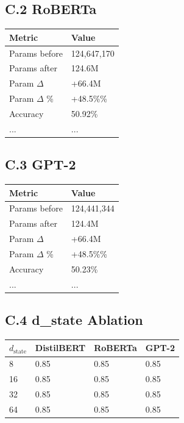 \subsection{C.2 RoBERTa}

\begin{table}[H]
\centering
\small
\begin{tabular}{ll}
\toprule
\textbf{Metric} & \textbf{Value} \\
\midrule
Params before & 124,647,170 \\
Params after & 124.6M \\
Param $\Delta$ & +66.4M \\
Param $\Delta$ \% & +48.5\%\% \\
Accuracy & 50.92\% \\
... & ... \\
\bottomrule
\end{tabular}
\end{table}

\subsection{C.3 GPT-2}

\begin{table}[H]
\centering
\small
\begin{tabular}{ll}
\toprule
\textbf{Metric} & \textbf{Value} \\
\midrule
Params before & 124,441,344 \\
Params after & 124.4M \\
Param $\Delta$ & +66.4M \\
Param $\Delta$ \% & +48.5\%\% \\
Accuracy & 50.23\% \\
... & ... \\
\bottomrule
\end{tabular}
\end{table}

\subsection{C.4 d\_state Ablation}

\begin{table}[H]
\centering
\small
\begin{tabular}{llll}
\toprule
\textbf{$d_\text{state}$} & \textbf{DistilBERT} & \textbf{RoBERTa} & \textbf{GPT-2} \\
\midrule
8 & 0.85 & 0.85 & 0.85 \\
16 & 0.85 & 0.85 & 0.85 \\
32 & 0.85 & 0.85 & 0.85 \\
64 & 0.85 & 0.85 & 0.85 \\
\bottomrule
\end{tabular}
\end{table}

